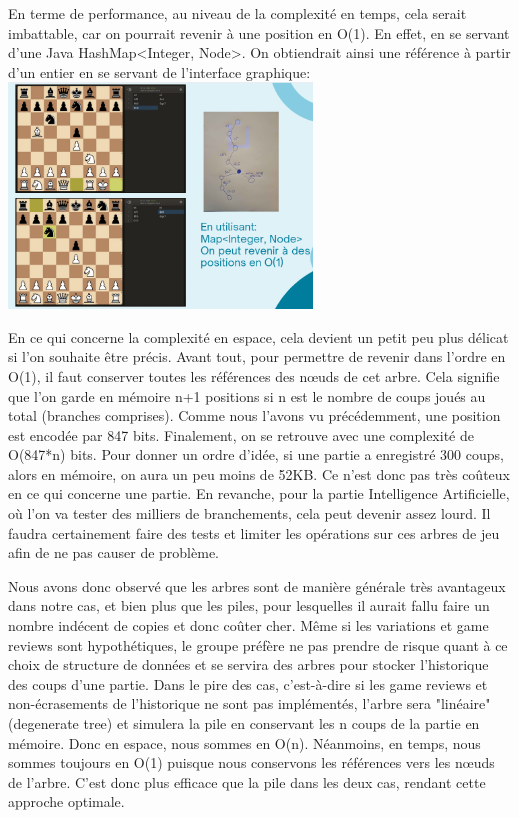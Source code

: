 \documentclass{article}
\begin{document}
En terme de performance, au niveau de la complexité en temps, cela serait imbattable, car on pourrait revenir à une position en O(1). En effet,
en se servant d'une Java HashMap\textless Integer, Node\textgreater. On obtiendrait ainsi une référence à partir d'un entier en se servant de
l'interface graphique:\\
\includegraphics[height=6.0cm]{arbres-reprise-coups.png}

En ce qui concerne la complexité en espace, cela devient un petit peu plus délicat si l'on souhaite être précis. Avant tout, pour permettre de
revenir dans l'ordre en O(1), il faut conserver toutes les références des nœuds de cet arbre. Cela signifie que l'on garde en mémoire n+1 positions 
si n est le nombre de coups joués au total (branches comprises). Comme nous l'avons vu précédemment, une position est encodée par 847 bits.
Finalement, on se retrouve avec une complexité de O(847*n) bits. Pour donner un ordre d'idée, si une partie a enregistré 300 coups, alors en mémoire,
on aura un peu moins de 52KB. Ce n'est donc pas très coûteux en ce qui concerne une partie. En revanche, pour la partie Intelligence Artificielle,
où l'on va tester des milliers de branchements, cela peut devenir assez lourd. Il faudra certainement faire des tests et limiter les opérations
sur ces arbres de jeu afin de ne pas causer de problème.

\par Nous avons donc observé que les arbres sont de manière générale très avantageux dans notre cas, et bien plus que les piles, pour lesquelles
il aurait fallu faire un nombre indécent de copies et donc coûter cher. Même si les variations et game reviews sont hypothétiques, le groupe préfère
ne pas prendre de risque quant à ce choix de structure de données et se servira des arbres pour stocker l'historique des coups d'une partie.
Dans le pire des cas, c'est-à-dire si les game reviews et non-écrasements de l'historique ne sont pas implémentés, l'arbre sera "linéaire"
(degenerate tree) et simulera la pile en conservant les n coups de la partie en mémoire. Donc en espace, nous sommes en O(n).
Néanmoins, en temps, nous sommes toujours en O(1) puisque nous conservons les références vers les nœuds de l'arbre. C'est donc plus efficace que
la pile dans les deux cas, rendant cette approche optimale.
\end{document}

